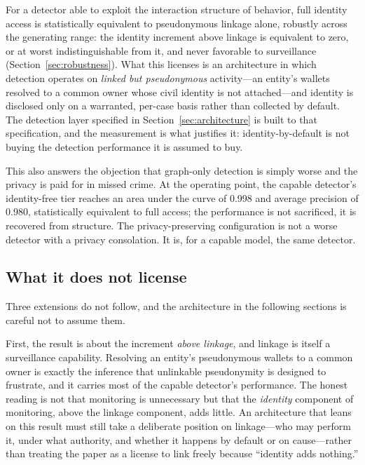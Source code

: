 \documentclass[11pt]{article}
\begin{document}
For a detector able to exploit the interaction structure of behavior, full identity access is
statistically equivalent to pseudonymous linkage alone, robustly across the generating range: the
identity increment above linkage is equivalent to zero, or at worst indistinguishable from it, and
never favorable to surveillance (Section~\ref{sec:robustness}). What this licenses is an architecture
in which detection operates on \emph{linked but pseudonymous} activity---an entity's wallets resolved
to a common owner whose civil identity is not attached---and identity is disclosed only on a
warranted, per-case basis rather than collected by default. The detection layer specified in
Section~\ref{sec:architecture} is built to that specification, and the measurement is what
justifies it: identity-by-default is not buying the detection performance it is assumed to buy.

This also answers the objection that graph-only detection is simply worse and the privacy is paid for
in missed crime. At the operating point, the capable detector's identity-free tier reaches an area
under the curve of 0.998 and average precision of 0.980, statistically equivalent to full access; the
performance is not sacrificed, it is recovered from structure. The privacy-preserving configuration
is not a worse detector with a privacy consolation. It is, for a capable model, the same detector.

\subsection{What it does not license}

Three extensions do not follow, and the architecture in the following sections is careful not to
assume them.

First, the result is about the increment \emph{above linkage}, and linkage is itself a surveillance
capability. Resolving an entity's pseudonymous wallets to a common owner is exactly the inference
that unlinkable pseudonymity is designed to frustrate, and it carries most of the capable detector's
performance. The honest reading is not that monitoring is unnecessary but that the \emph{identity}
component of monitoring, above the linkage component, adds little. An architecture that leans on this
result must still take a deliberate position on linkage---who may perform it, under what authority,
and whether it happens by default or on cause---rather than treating the paper as a license to link
freely because ``identity adds nothing.''
\end{document}
